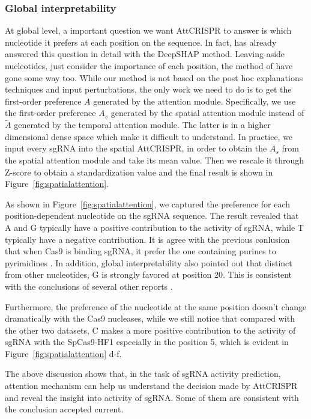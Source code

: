\documentclass{bioinfo}
\begin{document}
\subsubsection{Global interpretability}

At global level, a important question we want AttCRISPR to answer is which nucleotide it prefers at each position on the sequence. 
In fact, \citeauthor{wang2019optimized} has already answered this question in detail with the DeepSHAP method.
Leaving aside nucleotides, just consider the importance of each position, the method of \citeauthor{Liu2019} have gone some way too. 
While our method is not based on the post hoc explanations techniques and input perturbations, the only work we need to do is to get the first-order preference $A$ generated by the attention module.
Specifically, we use the first-order preference $A_s$ generated by the spatial attention module instead of  $\tilde{A}$ generated by the temporal attention module. 
The latter is in a higher dimensional dense space which make it difficult to understand. 
In practice, we input every sgRNA into the spatial AttCRISPR, in order to obtain the $A_s$ from the spatial attention module and take its mean value. 
Then we rescale it through Z-score to obtain a standardization value and the final result is shown in Figure~\ref{fig:spatialattention}. 

As shown in Figure~\ref{fig:spatialattention}, we captured the preference for each position-dependent nucleotide on the sgRNA sequence. 
The result revealed that A and G typically have a positive contribution to the activity of sgRNA, while T typically have a negative contribution. 
It is agree with the previous conlusion that when Cas9 is binding sgRNA, it prefer the one containing purines to pyrimidines \citep{wang2014genetic}. 
In addition, global interpretability also pointed out that distinct from other nucleotides, G is strongly favored at position 20. 
This is consistent with the conclusions of several other reports \citep{Wong2015,Doench2014}.

Furthermore, the preference of the nucleotide at the same position doesn't change dramatically with the Cas9 nucleases, 
while we still notice that compared with the other two datasets, 
C makes a more positive contribution to the activity of sgRNA with the SpCas9-HF1 especially in the position 5, which is evident in Figure~\ref{fig:spatialattention} d-f. 

The above discussion shows that, in the task of sgRNA activity prediction, 
attention mechanism can help us understand the decision made by AttCRISPR and reveal the insight into activity of sgRNA. 
Some of them are consistent with the conclusion accepted current. 
\end{document}
